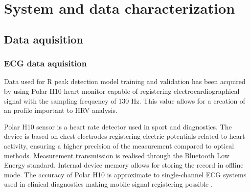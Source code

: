 \documentclass[journal]{IEEEtran}
\begin{document}
{%
\section{System and data characterization}
\subsection{Data aquisition}
\subsubsection{ECG data aquisition}
Data used for R peak detection model training and validation has been acquired by using Polar H10 heart monitor capable of registering electrocardiographical signal with the sampling frequency of 130 Hz. This value allows for a creation of an profile important to HRV analysis.

Polar H10 sensor is a heart rate detector used in sport and diagnostics. The device is based on chest electrodes registering electric potentials related to heart activity, ensuring a higher precision of the measurement compared to optical methods. Measurement transmission is realised through the Bluetooth Low Energy standard. Internal device memory allows for storing the record in offline mode. The accuracy of Polar H10 is approximate to single-channel ECG systems used in clinical diagnostics making mobile signal registering possible \cite{21}.

}
\end{document}
